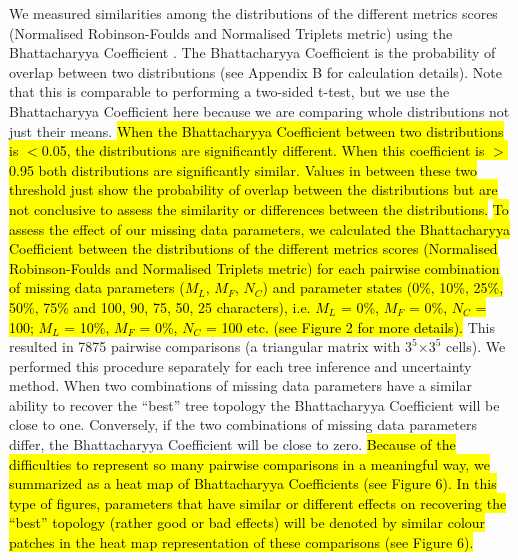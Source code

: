 \documentclass[12pt,letterpaper]{article}
\begin{document}
We measured similarities among the distributions of the different metrics scores (Normalised Robinson-Foulds and Normalised Triplets metric) using the Bhattacharyya Coefficient \citep{Bhattacharyya}.
The Bhattacharyya Coefficient is the probability of overlap between two distributions \citep{Bhattacharyya} (see Appendix B for calculation details).
Note that this is comparable to performing a two-sided t-test, but we use the Bhattacharyya Coefficient here because we are comparing whole distributions not just their means.
\hl{When the Bhattacharyya Coefficient between two distributions is $<$0.05, the distributions are significantly different.
When this coefficient is $>$0.95 both distributions are significantly similar.
Values in between these two threshold just show the probability of overlap between the distributions but are not conclusive to assess the similarity or differences between the distributions.}
\hl{To assess the effect of our missing data parameters, we calculated the Bhattacharyya Coefficient between the distributions of the different metrics scores (Normalised Robinson-Foulds and Normalised Triplets metric) for each pairwise combination of missing data parameters ($M_{L}$, $M_{F}$, $N_{C}$) and parameter states (0\%, 10\%, 25\%, 50\%, 75\% and 100, 90, 75, 50, 25 characters), i.e. $M_{L}$ = 0\%, $M_{F}$ = 0\%, $N_{C}$ = 100; $M_{L}$ = 10\%, $M_{F}$ = 0\%, $N_{C}$ = 100 etc. (see Figure 2 for more details).}
This resulted in 7875 pairwise comparisons (a triangular matrix with $3^5$$\times$$3^5$ cells).
We performed this procedure separately for each tree inference and uncertainty method.
When two combinations of missing data parameters have a similar ability to recover the ``best'' tree topology the Bhattacharyya Coefficient will be close to one.
Conversely, if the two combinations of missing data parameters differ, the Bhattacharyya Coefficient will be close to zero.
\hl{Because of the difficulties to represent so many pairwise comparisons in a meaningful way, we summarized as a heat map of Bhattacharyya Coefficients (see Figure 6).
In this type of figures, parameters that have similar or different effects on recovering the ``best'' topology (rather good or bad effects) will be denoted by similar colour patches in the heat map representation of these comparisons (see Figure 6).}

\end{document}
